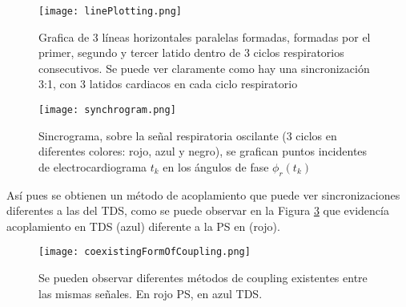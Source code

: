 \documentclass[twoside,twocolumn]{article}
\begin{document}
\begin{figure}[H]
\texttt{[image: linePlotting.png]}
\caption{Grafica de 3 líneas horizontales paralelas formadas, formadas por el primer, segundo y tercer latido dentro de 3 ciclos respiratorios consecutivos. Se puede ver claramente como hay una sincronización 3:1, con 3 latidos cardiacos en cada ciclo respiratorio}
\label{fig:linePlotting}
\end{figure}

\begin{figure}[H]
\texttt{[image: synchrogram.png]}
\caption{Sincrograma, sobre la señal respiratoria oscilante (3 ciclos en diferentes colores: rojo, azul y negro), se grafican puntos incidentes de electrocardiograma $t_k$ en los ángulos de fase $\phi_r(t_k)$\cite{bartsch2014coexisting}}
\label{fig:synchrogram}
\end{figure}
Así pues se obtienen un método de acoplamiento que puede ver sincronizaciones diferentes a las del TDS, como se puede observar en la Figura \ref{fig:coexistingFormOfCoupling} que evidencía acoplamiento en TDS (azul) diferente a la PS en (rojo).
\begin{figure}[H]
\texttt{[image: coexistingFormOfCoupling.png]}
\caption{Se pueden observar diferentes métodos de coupling existentes entre las mismas señales. En rojo PS, en azul TDS.}
\label{fig:coexistingFormOfCoupling}
\end{figure}
\renewcommand\refname{Referencias}
\printbibliography
\end{document}
